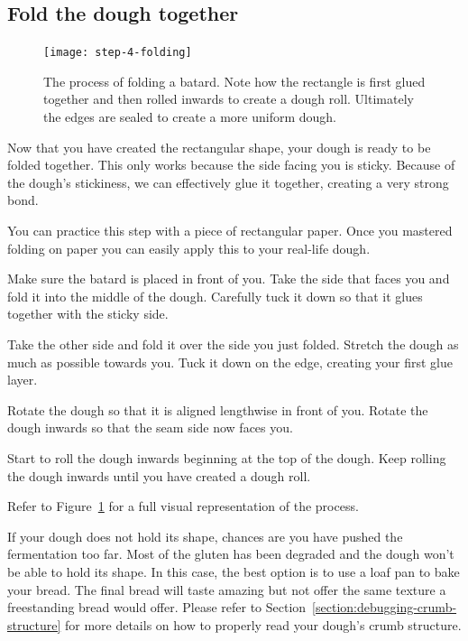 \subsection[Folding]{Fold the dough together}

\begin{figure}[htb!]
  \texttt{[image: step-4-folding]}
  \caption[Step 4 of shaping process]{The process of folding a batard. Note
      how the rectangle is first glued together and then rolled inwards to
      create a dough roll. Ultimately the edges are sealed to create a more
      uniform dough.}%
  \label{fig:shaping-folding}
\end{figure}

Now that you have created the rectangular shape, your dough
is ready to be folded together. This only works because the side
facing you is sticky. Because of the dough's stickiness,
we can effectively glue it together, creating a very
strong bond.

You can practice this step with a piece of rectangular paper.
Once you mastered folding on paper you can easily apply
this to your real-life dough.

Make sure the batard is placed in front of you. Take the side
that faces you and fold it into the middle of the dough. Carefully
tuck it down so that it glues together with the sticky side.

Take the other side and fold it over the side you just folded.
Stretch the dough as much as possible towards you. Tuck it down
on the edge, creating your first glue layer.

Rotate the dough so that it is aligned lengthwise in front of you.
Rotate the dough inwards so that the seam side
now faces you.

Start to roll the dough inwards beginning at the top of the dough.
Keep rolling the dough inwards until you have created a dough roll.

Refer to Figure~\ref{fig:shaping-folding} for a full visual
representation of the process.

If your dough does not hold its shape, chances are you have pushed
the fermentation too far. Most of the gluten has been degraded
and the dough won't be able to hold its shape. In this case,
the best option is to use a loaf pan to bake your bread. The
final bread will taste amazing but not offer the same texture
a freestanding bread would offer. Please refer to
Section~\ref{section:debugging-crumb-structure} for more
details on how to properly read your dough's crumb structure.

